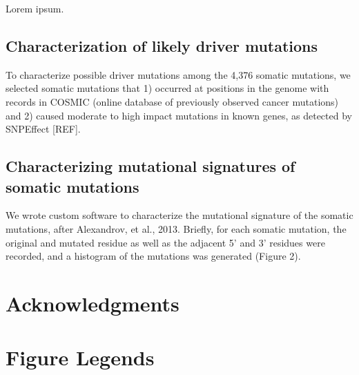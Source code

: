 \documentclass[10pt]{article}
\begin{document}
Lorem ipsum. 

\subsection*{Characterization of likely driver mutations}
To characterize possible driver mutations among the 4,376 somatic mutations, we selected somatic mutations that 1) occurred at positions in the genome with records in COSMIC (online database of previously observed cancer mutations) and 2) caused moderate to high impact mutations in known genes, as detected by SNPEffect [REF]. 

\subsection*{Characterizing mutational signatures of somatic mutations}
We wrote custom software to characterize the mutational signature of the somatic mutations, after Alexandrov, et al., 2013. Briefly, for each somatic mutation, the original and mutated residue as well as the adjacent 5' and 3' residues were recorded, and a histogram of the mutations was generated (Figure 2). 


\section*{Acknowledgments}



\section*{Figure Legends}
\end{document}
